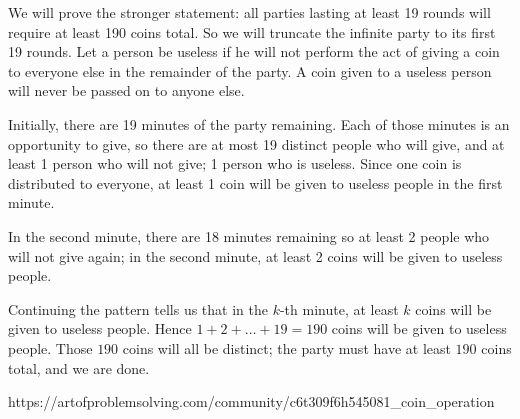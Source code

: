 \documentclass[a4paper]{article}
\begin{document}
\begin{question}[]{}
{We will prove the stronger statement: all parties lasting at least 19 rounds will require at least 190 coins total. So we will truncate the infinite party to its first 19 rounds.
Let a person be useless if he will not perform the act of giving a coin to everyone else in the remainder of the party.
A coin given to a useless person will never be passed on to anyone else.

Initially, there are 19 minutes of the party remaining. Each of those minutes is an opportunity to give, so there are at most 19 distinct people who will give, and at least 1 person who will not give; 1 person who is useless.
Since one coin is distributed to everyone, at least 1 coin will be given to useless people in the first minute.

In the second minute, there are 18 minutes remaining so at least 2 people who will not give again; in the second minute, at least 2 coins will be given to useless people.

Continuing the pattern tells us that in the $k$-th minute, at least $k$ coins will be given to useless people.
Hence $1 + 2 + \ldots + 19 = 190$ coins will be given to useless people.
Those $190$ coins will all be distinct; the party must have at least $190$ coins total, and we are done.
    }{%
    https://artofproblemsolving.com/community/c6t309f6h545081_coin_operation
  }

\end{question}
\end{document}
